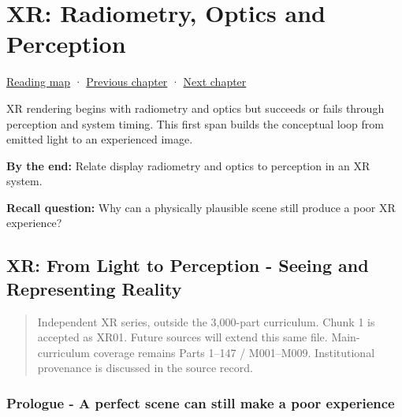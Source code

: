 \chapter{XR: Radiometry, Optics and Perception}\label{04-visual-computing-ii-ch042-xr-radiometry-optics-and-perception}\hypertarget{04-visual-computing-ii-ch042}{}\label{stagechapter:04-visual-computing-ii-ch042}

\hypertarget{04-visual-computing-ii-ch042-xr-radiometry-optics-and-perception}{}

\hyperref[volume-reading-map]{Reading map} · \hyperref[04-visual-computing-ii-ch039]{Previous chapter} · \hyperref[04-visual-computing-ii-ch043-xr-extended-walkthrough-and-verification-checkpoints]{Next chapter}

XR rendering begins with radiometry and optics but succeeds or fails through perception and system timing. This first span builds the conceptual loop from emitted light to an experienced image.

\textbf{By the end:} Relate display radiometry and optics to perception in an XR system.

\textbf{Recall question:} Why can a physically plausible scene still produce a poor XR experience?

\section{XR: From Light to Perception - Seeing and Representing Reality}\label{04-visual-computing-ii-ch042-xr-from-light-to-perception---seeing-and-representing-reality}

\hypertarget{04-visual-computing-ii-ch042-xr-from-light-to-perception---seeing-and-representing-reality}{}

\begin{quote}
Independent XR series, outside the 3,000-part curriculum. Chunk 1 is accepted as XR01. Future sources will extend this same file. Main-curriculum coverage remains Parts 1--147 / M001--M009. Institutional provenance is discussed in the source record.
\end{quote}

\subsection{Prologue - A perfect scene can still make a poor experience}\label{04-visual-computing-ii-ch042-prologue---a-perfect-scene-can-still-make-a-poor-experience}

\hypertarget{04-visual-computing-ii-ch042-prologue---a-perfect-scene-can-still-make-a-poor-experience}{}

